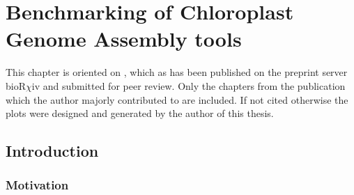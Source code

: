 \newcommand{\formatprogramnames}[1]{\texttt{#1}}
\newcommand{\ce}{\formatprogramnames{chloroExtractor}}
\newcommand{\oa}{\formatprogramnames{ORG.Asm}}
\newcommand{\fp}{\formatprogramnames{Fast-Plast}}
\newcommand{\ioga}{\formatprogramnames{IOGA}}
\newcommand{\np}{\formatprogramnames{NOVOPlasty}}
\newcommand{\go}{\formatprogramnames{GetOrganelle}}
\newcommand{\cassp}{\formatprogramnames{Chloroplast assembly protocol}}



\chapter{Benchmarking of Chloroplast Genome Assembly tools } %

\label{Chapter1} %
This chapter is oriented on \cite{freudenthal2019landscape}, which as
has been published on the preprint server bioR$\chi$iv and submitted
for peer review. Only the chapters from the publication which the
author majorly contributed to are included. If not cited otherwise the
plots were designed and generated by the author of this thesis.


\newcommand{\keyword}[1]{\textbf{#1}}
\newcommand{\tabhead}[1]{\textbf{#1}}
\newcommand{\code}[1]{\texttt{#1}}
\newcommand{\file}[1]{\texttt{\bfseries#1}}
\newcommand{\option}[1]{\texttt{\itshape#1}}


\section{Introduction} \label{intro:cp}
\subsection{Motivation}

